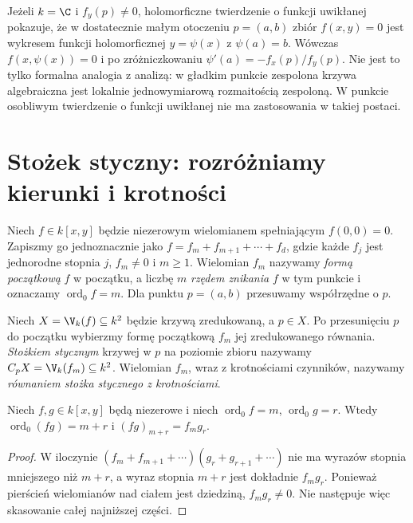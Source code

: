 \begin{uwaga}
Jeżeli $k=\C$ i $f_y(p)\ne0$, holomorficzne twierdzenie
o funkcji uwikłanej pokazuje, że w dostatecznie małym
otoczeniu $p=(a,b)$ zbiór $f(x,y)=0$ jest wykresem
funkcji holomorficznej $y=\psi(x)$ z $\psi(a)=b$.
Wówczas $f(x,\psi(x))=0$ i po zróżniczkowaniu
$\psi'(a)=-f_x(p)/f_y(p)$. Nie jest to tylko formalna
analogia z analizą: w gładkim punkcie zespolona krzywa
algebraiczna jest lokalnie jednowymiarową rozmaitością
zespoloną. W punkcie osobliwym twierdzenie o funkcji
uwikłanej nie ma zastosowania w takiej postaci.
\end{uwaga}

\section{Stożek styczny: rozróżniamy kierunki i krotności}

\begin{definicja}
Niech $f\in k[x,y]$ będzie niezerowym wielomianem
spełniającym $f(0,0)=0$. Zapiszmy go jednoznacznie jako
$f=f_m+f_{m+1}+\cdots+f_d$, gdzie każde $f_j$
jest jednorodne stopnia $j$, $f_m\ne0$ i $m\ge1$.
Wielomian $f_m$ nazywamy \emph{formą początkową} $f$
w początku, a liczbę $m$ \emph{rzędem znikania} $f$
w tym punkcie i oznaczamy $\operatorname{ord}_0f=m$.
Dla punktu $p=(a,b)$ przesuwamy współrzędne o $p$.
\end{definicja}

\begin{definicja}
Niech $X=\V_k(f)\subseteq k^2$ będzie krzywą zredukowaną,
a $p\in X$. Po przesunięciu $p$ do początku wybierzmy
formę początkową $f_m$ jej zredukowanego równania.
\emph{Stożkiem stycznym} krzywej w $p$ na poziomie zbioru
nazywamy $C_pX=\V_k(f_m)\subseteq k^2$.
Wielomian $f_m$, wraz z krotnościami czynników,
nazywamy \emph{równaniem stożka stycznego z krotnościami}.
\end{definicja}

\begin{lemat}
Niech $f,g\in k[x,y]$ będą niezerowe i niech
$\operatorname{ord}_0f=m$, $\operatorname{ord}_0g=r$.
Wtedy $\operatorname{ord}_0(fg)=m+r$ i
$(fg)_{m+r}=f_mg_r$.
\end{lemat}
\begin{proof}
W iloczynie $(f_m+f_{m+1}+\cdots)(g_r+g_{r+1}+\cdots)$
nie ma wyrazów stopnia mniejszego niż $m+r$,
a wyraz stopnia $m+r$ jest dokładnie $f_mg_r$.
Ponieważ pierścień wielomianów nad ciałem jest dziedziną,
$f_mg_r\ne0$. Nie następuje więc skasowanie całej
najniższej części.
\end{proof}

